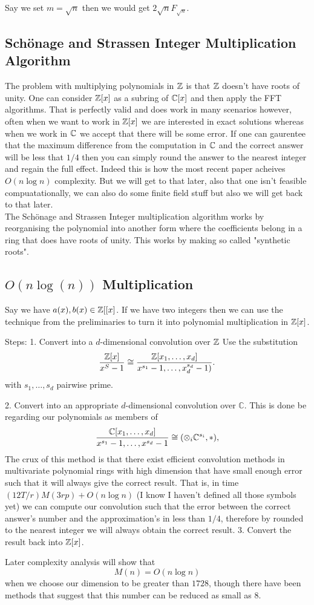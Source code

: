 Say we set $m = \sqrt{n}$ then we would get $2\sqrt{n}F_{\sqrt{n}}$. 

\subsection{Sch\"{o}nage and Strassen Integer Multiplication Algorithm}
\label{subsec:schon-strass}

The problem with multiplying polynomials in ${\mathbb Z}$ is that ${\mathbb Z}$ doesn't have roots of unity. One can consider ${\mathbb Z}[x]$ as a subring of $\mathbb{C}[x]$ and then apply the FFT algorithms. That is perfectly valid and does work in many scenarios however, often when we want to work in ${\mathbb Z}[x]$ we are interested in exact solutions whereas when we work in $\mathbb{C}$ we accept that there will be some error. If one can gaurentee that the maximum difference from the computation in $\mathbb{C}$ and the correct answer will be less that $1/4$ then you can simply round the answer to the nearest integer and regain the full effect. Indeed this is how the most recent paper acheives $O(n\log n)$ complexity. But we will get to that later, also that one isn't feasible compuatationally, we can also do some finite field stuff but also we will get back to that later.\\
The Sch\"{o}nage and Strassen Integer multiplication algorithm works by reorganising the polynomial into another form where the coefficients belong in a ring that does have roots of unity. This works by making so called "synthetic roots".



\subsection{$O(n\log(n))$ Multiplication}
\label{subsec:nlogn}

Say we have $a(x) , b(x) \in {\mathbb Z}[[x]$. If we have two integers then we can use the technique from the preliminaries to turn it into polynomial multiplication in ${\mathbb Z}[x]$.

Steps:
1. Convert into a $d$-dimensional convolution over ${\mathbb Z}$
Use the substitution
\[
  \frac{{\mathbb Z}[x]}{x^S - 1} \cong \frac{{\mathbb Z}[x_1, \ldots, x_d]}{x^{s_1} - 1, \ldots, x_d^{s_d} - 1)}.
\]
with $s_1, \ldots, s_d$ pairwise prime.

2. Convert into an appropriate $d$-dimensional convolution over $\mathbb{C}$.
This is done be regarding our polynomials as members of
\[
  \frac{\mathbb{C}[x_1, \ldots, x_d]}{x^{s_1} - 1, \ldots, x^{s_d} - 1} \cong (\otimes_i \mathbb{C}^{s_i}, \ast),
\]
The crux of this method is that there exist efficient convolution methods in multivariate polynomial rings with high dimension that have small enough error such that it will always give the correct result. That is, in time $(12T/r)M(3rp) + O(n\log n)$ (I know I haven't defined all those symbols yet) we can compute our convolution such that the error between the correct answer's number and the approximation's in less than $1 / 4$, therefore by rounded to the nearest integer we will always obtain the correct result.
3. Convert the result back into ${\mathbb Z}[x]$.

Later complexity analysis will show that 
\[
  M(n) = O(n \log n)
\]
when we choose our dimension to be greater than $1728$, though there have been methods that suggest that this number can be reduced as small as $8$.

